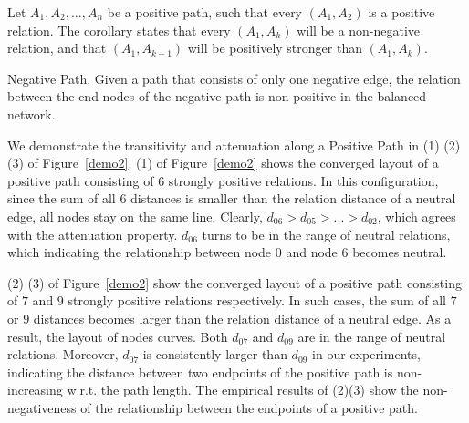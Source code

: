 Let $A_{1},A_{2},...,A_{n}$ be a positive path, such that every $(A_{1}, A_{2})$ is a positive relation. The corollary states that every $(A_{1}, A_{k})$ will be a non-negative relation, and that $(A_{1}, A_{k-1})$ will be positively stronger than $(A_{1}, A_{k})$.
\begin{corollary}\label{negative path}
Negative Path. Given a path that consists of only one negative edge, the relation between the end nodes of the negative path is non-positive in the balanced network. 
\end{corollary}
We demonstrate the transitivity and attenuation along a Positive Path in (1) (2) (3) of Figure~\ref{demo2}. (1) of Figure~\ref{demo2} shows the converged layout of a positive path consisting of $6$ strongly positive relations. In this configuration, since the sum of all $6$ distances is smaller than the relation distance of a neutral edge, all nodes stay on the same line. Clearly, $d_{06} > d_{05}>...>d_{02}$, which agrees with the attenuation property. $d_{06}$ turns to be in the range of neutral relations, which indicating the relationship between node $0$ and node $6$ becomes neutral.  

(2) (3) of Figure~\ref{demo2} show the converged layout of a positive path consisting of $7$ and $9$ strongly positive relations respectively. In such cases,  the sum of all $7$ or $9$ distances becomes larger than the relation distance of a neutral edge. As a result, the layout of nodes curves. Both $d_{07}$ and $d_{09}$ are in the range of neutral relations. Moreover, $d_{07}$ is consistently larger than $d_{09}$ in our experiments, indicating the distance between two endpoints of the positive path is non-increasing w.r.t. the path length. The empirical results of (2)(3) show the non-negativeness of the relationship between the endpoints of a positive path.

